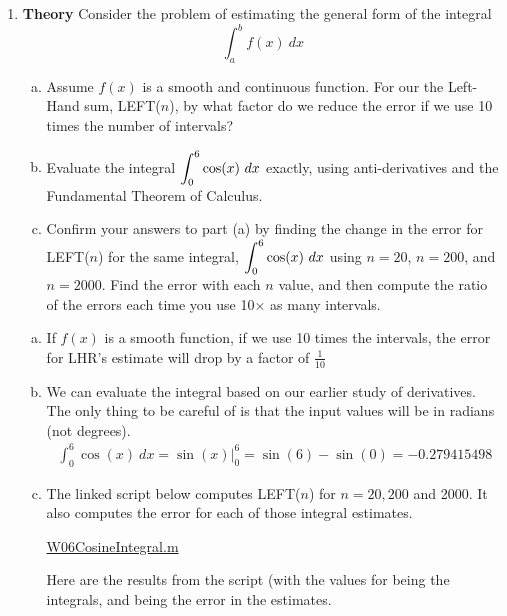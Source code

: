 \begin{enumerate}[1.]
\item \begin{Question}
{\bf Theory} Consider the problem of estimating the general form
  of the integral $$\int_a^b f(x)~dx$$
\begin{enumerate}[(a)]
\item Assume $f(x)$ is a smooth and continuous function.  For our the
  Left-Hand sum, LEFT($n$), by what factor do we reduce the error if
  we use 10 times the number of intervals?

\item Evaluate the integral $\displaystyle \int_0^6 \cos(x)~dx$ exactly, using
  anti-derivatives and the Fundamental Theorem of Calculus.

\item Confirm your answers to part (a) by finding the change in the
  error for LEFT($n$) for the same integral, $\displaystyle \int_0^6 \cos(x)~dx$
  using $n=20$, $n=200$, and $n = 2000$.  Find the error with each $n$
  value, and then compute the ratio of the errors each time you use 10$\times$ as many intervals.
\end{enumerate}
\end{Question}

\begin{Solution}
\begin{enumerate}[(a)]
\item If $f(x)$ is a smooth function, if we use 10 times the
  intervals, the error for LHR's estimate will drop by a factor of $\frac{1}{10}$
\item We can evaluate the integral based on our earlier study of
  derivatives. The only thing to be careful of is that the input
  values will be in radians (not degrees).
  \begin{align*}
    \int_0^6 \cos(x)~dx = \sin(x) \Big|_0^6 = \sin(6) - \sin(0) = -0.279415498
  \end{align*}

\item  The linked script below computes LEFT($n$) for $n=20, 200$ and 2000.  It also computes
the error for each of those integral estimates. 

\href{http://www.mast.queensu.ca/~apsc171/MNTCP01/PracticeProblems/MATLAB/W06CosineIntegral.m}{W06CosineIntegral.m}

Here are the results from the script (with the values for \verb@I@
being the integrals, and \verb@Err@ being the error in the estimates.


\end{enumerate}
\end{Solution}
\end{enumerate}
